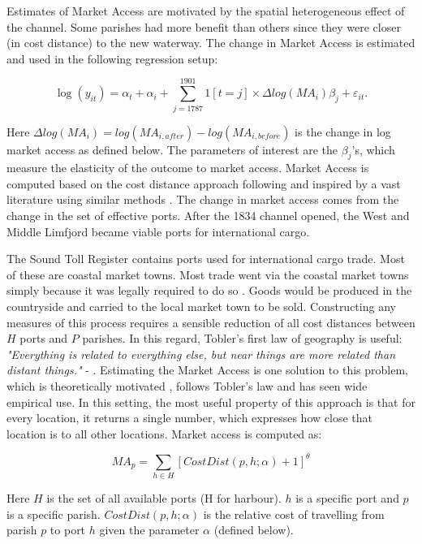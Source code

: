 \documentclass[11pt]{article}
\begin{document}
Estimates of Market Access are motivated by the spatial heterogeneous effect of the channel. Some parishes had more benefit than others since they were closer (in cost distance) to the new waterway. The change in Market Access is estimated and used in the following regression setup: 

\begin{equation}
\label{eq:eq503}
\log(y_{it})= \alpha_t + \alpha_i + \sum_{j=1787}^{1901} 1[t=j] \times \Delta log(MA_i)\beta_{j} + \varepsilon_{it}.
\end{equation}

Here $\Delta log(MA_i) = log(MA_{i,after}) - log(MA_{i,before})$ is the change in log market access as defined below. The parameters of interest are the $\beta_{j}$'s, which measure the elasticity of the outcome to market access.  Market Access is computed based on the cost distance approach following \cite{rauch2022a} and inspired by a vast literature using similar methods \citep{Harris1954, Redding2008, Ahlfeldt2015, Donaldson2016}. The change in market access comes from the change in the set of effective ports. After the 1834 channel opened, the West and Middle Limfjord became viable ports for international cargo. 

The Sound Toll Register contains ports used for international cargo trade. Most of these are coastal market towns. Most trade went via the coastal market towns simply because it was legally required to do so \cite{Degn1989}. Goods would be produced in the countryside and carried to the local market town to be sold. Constructing any measures of this process requires a sensible reduction of all cost distances between $H$ ports and $P$ parishes. In this regard, Tobler's first law of geography is useful: \textit{"Everything is related to everything else, but near things are more related than distant things."} - \cite{Tobler1970}. Estimating the Market Access is one solution to this problem, which is theoretically motivated \citep{eaton2002}, follows Tobler's law and has seen wide empirical use. In this setting, the most useful property of this approach is that for every location, it returns a single number, which expresses how close that location is to all other locations. Market access is computed as:

\begin{equation}
\label{eq:MA2}
{MA}_p = \sum_{h \in H} [CostDist(p, h; \alpha) + 1]^\theta
\end{equation}

Here $H$ is the set of all available ports (H for harbour). $h$ is a specific port and $p$ is a specific parish. $CostDist(p, h; \alpha)$ is the relative cost of travelling from parish $p$ to port $h$ given the parameter $\alpha$ (defined below). 
\end{document}
